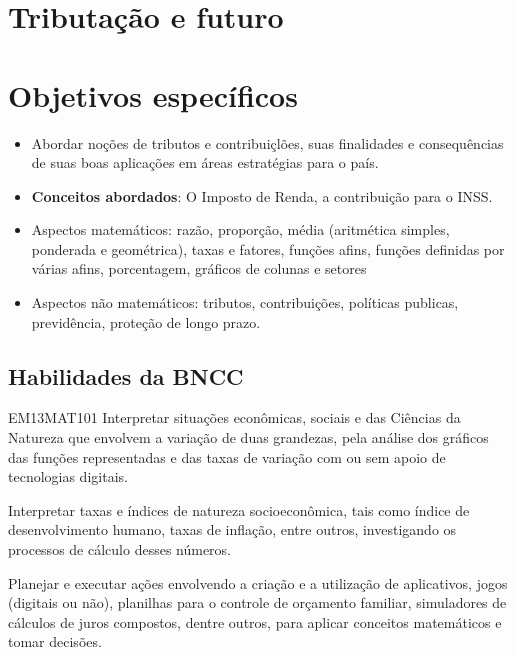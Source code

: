 \begin{paginatexto}
\section*{Tributação e futuro}
\section*{Objetivos específicos}
\begin{itemize}
\item Abordar noções de tributos e contribuiçlões, suas finalidades e consequências de suas boas aplicações em áreas estratégias para o país.

\item \textbf{Conceitos abordados}: O Imposto de Renda, a contribuição para o INSS.

\item Aspectos matemáticos: razão, proporção, média (aritmética simples, ponderada e geométrica), taxas e fatores, funções afins, funções definidas por várias afins, porcentagem, gráficos de colunas e setores

\item Aspectos não matemáticos: tributos, contribuições, políticas publicas, previdência, proteção de longo prazo.
\end{itemize}

\subsection{Habilidades da BNCC}

\begin{habilities}{EM13MAT101}
 Interpretar situações econômicas, sociais e das Ciências da Natureza
que envolvem a variação de duas grandezas, pela análise dos gráficos das funções representadas e das taxas de variação com ou sem apoio de tecnologias digitais.


Interpretar taxas e índices de natureza socioeconômica, tais como índice de desenvolvimento humano, taxas de inflação, entre outros, investigando os processos de cálculo desses números.

Planejar e executar ações envolvendo a criação e a utilização de aplicativos, jogos (digitais ou não), planilhas para o controle de orçamento familiar, simuladores de cálculos de juros compostos, dentre outros, para aplicar conceitos matemáticos e tomar decisões. 


\end{habilities}
\end{paginatexto}
